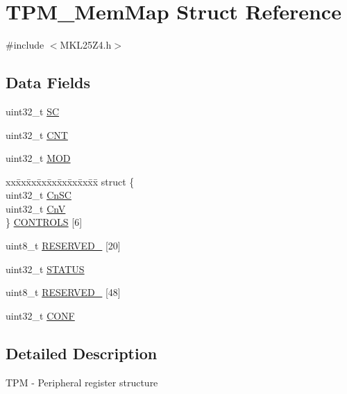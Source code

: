 \hypertarget{struct_t_p_m___mem_map}{}\section{T\+P\+M\+\_\+\+Mem\+Map Struct Reference}
\label{struct_t_p_m___mem_map}


{\ttfamily \#include $<$M\+K\+L25\+Z4.\+h$>$}

\subsection*{Data Fields}
\begin{DoxyCompactItemize}
\item 
uint32\+\_\+t \hyperlink{struct_t_p_m___mem_map_af4ec20dde961637160e35e7ab113d9da}{SC}
\item 
uint32\+\_\+t \hyperlink{struct_t_p_m___mem_map_ac86225aa77135d95142aa86b8c0fe010}{C\+NT}
\item 
uint32\+\_\+t \hyperlink{struct_t_p_m___mem_map_af46c48b6009bc12f49d484ee9859bcf9}{M\+OD}
\item 
\begin{tabbing}
xx\=xx\=xx\=xx\=xx\=xx\=xx\=xx\=xx\=\kill
struct \{\\
\>uint32\_t \hyperlink{struct_t_p_m___mem_map_a62c97f42d3dcb6b93f06ca42e3fe7fba}{CnSC}\\
\>uint32\_t \hyperlink{struct_t_p_m___mem_map_a352e4ab0141e02eff068ec3047693065}{CnV}\\
\} \hyperlink{struct_t_p_m___mem_map_ae883c773f68fdd92b71722a745e48e17}{CONTROLS} \mbox{[}6\mbox{]}\\

\end{tabbing}\item 
uint8\+\_\+t \hyperlink{struct_t_p_m___mem_map_ab36427a89ccceaa5fce62275f286f205}{R\+E\+S\+E\+R\+V\+E\+D\+\_} \mbox{[}20\mbox{]}
\item 
uint32\+\_\+t \hyperlink{struct_t_p_m___mem_map_abf85830377235aa5b5d58cc0f86d06b7}{S\+T\+A\+T\+US}
\item 
uint8\+\_\+t \hyperlink{struct_t_p_m___mem_map_a499e989c62e9a964e2fdb7ef685ea038}{R\+E\+S\+E\+R\+V\+E\+D\+\_} \mbox{[}48\mbox{]}
\item 
uint32\+\_\+t \hyperlink{struct_t_p_m___mem_map_ad54647b8ab5b1dab6948a3d5a13ea8d7}{C\+O\+NF}
\end{DoxyCompactItemize}


\subsection{Detailed Description}
T\+PM -\/ Peripheral register structure 

